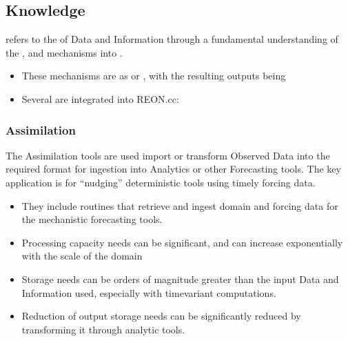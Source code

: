\documentclass[letterpaper,12pt,english]{book}
\begin{document}
\subsection{Knowledge}
\label{\detokenize{requirements/knowledge/index:knowledge}}\label{\detokenize{requirements/knowledge/index::doc}}
\sphinxAtStartPar
{} refers to the  of Data and Information through a fundamental understanding of the ,  and  mechanisms into .
\begin{itemize}
\item {} 
\sphinxAtStartPar
These mechanisms are  as  or , with the resulting outputs being 

\item {} 
\sphinxAtStartPar
Several  are integrated into REON.cc:

\end{itemize}


\subsubsection{Assimilation}
\label{\detokenize{requirements/knowledge/assimilation:assimilation}}\label{\detokenize{requirements/knowledge/assimilation::doc}}
\sphinxAtStartPar
The Assimilation tools are used import or transform Observed Data into the required format for ingestion into Analytics or other Forecasting tools. The key application is for “nudging” deterministic tools using timely forcing data.
\begin{itemize}
\item {} 
\sphinxAtStartPar
They include routines that retrieve and ingest domain and forcing data for the mechanistic forecasting tools.

\item {} 
\sphinxAtStartPar
Processing capacity needs can be significant, and can increase exponentially with the scale of the domain

\item {} 
\sphinxAtStartPar
Storage needs can be orders of magnitude greater than the input Data and Information used, especially with time\sphinxhyphen{}variant computations.

\item {} 
\sphinxAtStartPar
Reduction of output storage needs can be significantly reduced by transforming it through analytic tools.

\end{itemize}
\end{document}
